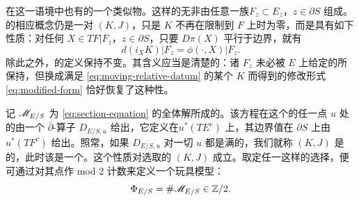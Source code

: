 \begin{remark}\label{thm:moving-boundary-analogue}
在这一语境中也有\trMovingBoundaryCondition{}的一个类似物。这样的\trBoundaryCondition{}无非由任意一族\trExact\trLagrange\trSubmanifold{}$F_z\subset E_z$，$z\in\partial S$ 组成。\trRelative\trPerturbationDatum{}的相应概念仍是一对 $(K,J)$，只是 $K$ 不再在限制到 $F$ 上时为零，而是具有如下性质：对任何 $X\in TF|F_z$，$z\in\partial S$，只要 $D\pi(X)$ 平行于边界，就有
\begin{equation}\label{eq:moving-relative-datum}
d(i_XK)|F_z=\phi(\cdot,X)|F_z.
\end{equation}
除此之外，\trInhomogeneous\trPseudoholomorphic\trSection{}的定义保持不变。其含义应当是清楚的：诸 $F_z$ 未必被 $E$ 上给定\trSymplectic\trConnection{}的\trParallelTransport{}所保持，但换成满足 \eqref{eq:moving-relative-datum} 的某个 $K$ 而得到的修改形式 \eqref{eq:modified-form} 恰好恢复了这种\trCompatible{}性。
\end{remark}
记 $\mathscr{M}_{E/S}$ 为 \eqref{eq:section-equation} 的全体解所成的\trModuliSpace。该方程在这个\trModuliSpace{}的任一点 $u$ 处的\trLinearization{}由一个 $\bar\partial$-算子 $D_{E/S,u}$ 给出，它定义在\trVectorBundle{}$u^*(TE^v)$ 上，其边界值在 $\partial S$ 上由 $u^*(TF^v)$ 给出。照常，如果 $D_{E/S,u}$ 对一切 $u$ 都是满的，我们就称 $(K,J)$ 是\trRegular{}的，此时该\trModuliSpace{}是一个\trClosed\trSmooth\trManifold。这个性质对\trGeneric{}选取的 $(K,J)$ 成立。取定任一这样的选择，便可通过对其\trIsolated{}点作 mod 2 计数来定义一个玩具模型\trInvariant：
\begin{equation}\label{eq:toy-invariant}
\Phi_{E/S}=\#\mathscr{M}_{E/S}\in\mathbb{Z}/2.
\end{equation}
